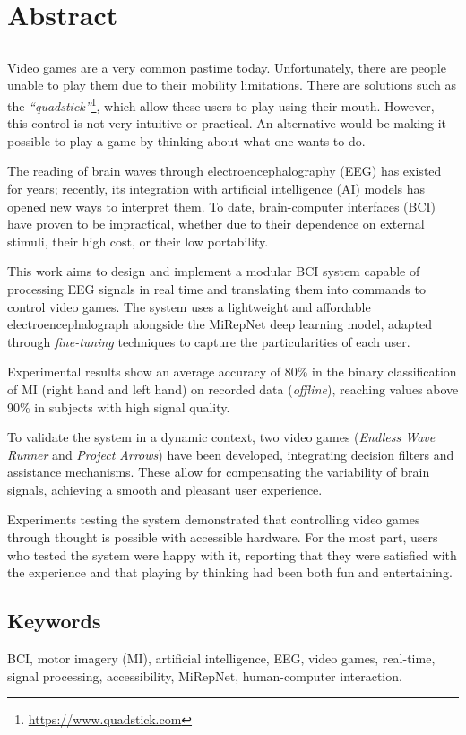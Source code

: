 \chapter*{Abstract}

\section*{\tituloPortadaEngVal}

Video games are a very common pastime today. Unfortunately, there are people
unable to play them due to their mobility limitations. There are solutions such
as the \textit{``quadstick''}\footnote{\url{https://www.quadstick.com}}, which
allow these users to play using their mouth. However, this control is not very
intuitive or practical. An alternative would be making it possible to play a
game by thinking about what one wants to do.

The reading of brain waves through electroencephalography (EEG) has existed for
years; recently, its integration with artificial intelligence (AI) models has
opened new ways to interpret them. To date, brain-computer interfaces (BCI)
have proven to be impractical, whether due to their dependence on external
stimuli, their high cost, or their low portability.

This work aims to design and implement a modular BCI system capable of
processing EEG signals in real time and translating them into commands to
control video games. The system uses a lightweight and affordable
electroencephalograph alongside the MiRepNet deep learning model, adapted
through \textit{fine-tuning} techniques to capture the particularities of each
user.

Experimental results show an average accuracy of 80\% in the binary
classification of MI (right hand and left hand) on recorded data
(\textit{offline}), reaching values above 90\% in subjects with high signal
quality.

To validate the system in a dynamic context, two video games (\textit{Endless
    Wave Runner} and \textit{Project Arrows}) have been developed, integrating
decision filters and assistance mechanisms. These allow for compensating the
variability of brain signals, achieving a smooth and pleasant user experience.

Experiments testing the system demonstrated that controlling video games
through thought is possible with accessible hardware. For the most part, users
who tested the system were happy with it, reporting that they were satisfied
with the experience and that playing by thinking had been both fun and
entertaining. \section*{Keywords}

\noindent BCI, motor imagery (MI), artificial intelligence, EEG, video games, real-time, signal processing, accessibility, MiRepNet, human-computer interaction.